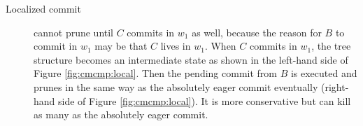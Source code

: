\begin{description}
\item[Localized commit] cannot prune until $C$ commits in $w_1$ as well, because the reason for $B$ to commit in $w_1$ may be that $C$ lives in $w_1$. When $C$ commits in $w_1$, the tree structure becomes an intermediate state as shown in the left-hand side of Figure \ref{fig:cmcmp:local}. Then the pending commit from $B$ is executed and prunes in the same way as the absolutely eager commit eventually (right-hand side of Figure \ref{fig:cmcmp:local}). It is more conservative but can kill as many as the absolutely eager commit.
\end{description}

\begin{figure}
\centering\small
{}
\end{figure}
